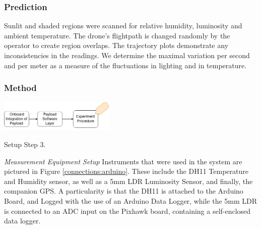 \subsubsection{Prediction}

Sunlit and shaded regions were scanned for relative humidity, luminosity and ambient temperature. The drone’s flightpath is changed randomly by the operator to create region overlaps. The trajectory plots demonstrate any inconsistencies in the readings. We determine the maximal variation per second and per meter as a measure of the fluctuations in lighting and in temperature.

\subsubsection{Method}


\begin{marginfigure}%
    \raggedright
    {\includegraphics[width=5.5cm]{images/stage_system/drone_setup/payload_onboard3.png}}
    \caption{Setup Step 3.}
    \label{fig:zone_scan_prep3}
\end{marginfigure}


\textit{Measurement Equipment Setup} \hspace{0.3cm} Instruments that were used in the system are pictured in Figure \ref{connections:arduino}. These include the DH11 Temperature and Humidity sensor, as well as a 5mm LDR Luminosity Sensor, and finally, the companion GPS. A particularity is that the DH11 is attached to the Arduino Board, and Logged with the use of an Arduino Data Logger, while the 5mm LDR is connected to an ADC input on the Pixhawk board, containing a self-enclosed data logger.


